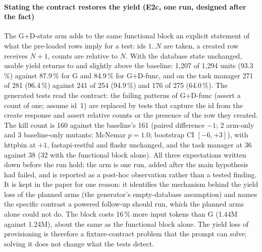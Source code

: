 \documentclass[preprint,12pt]{elsarticle}
\begin{document}
\paragraph{Stating the contract restores the yield (E2c, one run, designed after the fact)} The G+D-state arm adds to the same functional block an explicit statement of what the pre-loaded rows imply for a test: ids $1..N$ are taken, a created row receives $N+1$, counts are relative to $N$. With the database state unchanged, usable yield returns to and slightly above the baseline: 1,207 of 1,294 units (93.3\,\%) against 87.9\,\% for G and 84.9\,\% for G+D-func, and on the task manager 271 of 281 (96.4\,\%) against 241 of 254 (94.9\,\%) and 176 of 275 (64.0\,\%). The generated tests read the contract: the failing patterns of G+D-func (assert a count of one; assume id~1) are replaced by tests that capture the id from the create response and assert relative counts or the presence of the row they created. The kill count is 160 against the baseline's 161 (paired difference $-1$; 2 arm-only and 3 baseline-only mutants; McNemar $p=1.0$; bootstrap CI $[-6,+3]$), with httpbin at $+1$, fastapi-restful and flaskr unchanged, and the task manager at 36 against 38 (32 with the functional block alone). All three expectations written down before the run hold; the arm is one run, added after the main hypothesis had failed, and is reported as a post-hoc observation rather than a tested finding. It is kept in the paper for one reason: it identifies the mechanism behind the yield loss of the planned arms (the generator's empty-database assumption) and names the specific contrast a powered follow-up should run, which the planned arms alone could not do. The block costs 16\,\% more input tokens than G (1.44M against 1.24M), about the same as the functional block alone. The yield loss of provisioning is therefore a fixture-contract problem that the prompt can solve; solving it does not change what the tests detect.
\end{document}
